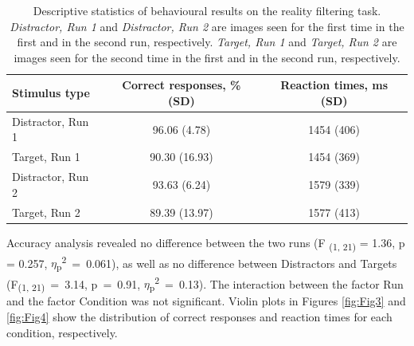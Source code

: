 \begin{table}
\begin{center}
\begin{tabular}{ ||l||c c|| } 

  \hline
\rowcolor{BabyBlue}
Stimulus type & Correct responses, \% (SD) & Reaction times, ms (SD) \\
  \hline
  \hline
Distractor, Run 1   & 96.06 (4.78) & 1454 (406) \\ 
  \hline
Target, Run 1      & 90.30 (16.93) & 1454 (369) \\ 
  \hline
Distractor, Run 2  & 93.63 (6.24) & 1579 (339) \\ 
  \hline
Target, Run 2      & 89.39 (13.97) & 1577 (413) \\ 

 \hline
\end{tabular}
\end{center}
\caption{Descriptive statistics of behavioural results on the reality filtering task. \textit{Distractor, Run 1} and \textit{Distractor, Run 2} are images seen for the first time in the first and in the second run, respectively. \textit{Target, Run 1} and \textit{Target, Run 2} are images seen for the second time in the first and in the second run, respectively.} \label{tbl:stimulus}
\end{table}




Accuracy analysis revealed no difference between the two runs (F \textsubscript{(1, 21)} = 1.36, p = 0.257, $\eta$\textsubscript{p}\textsuperscript{2}~=~0.061), as well as no difference between Distractors and Targets (F\textsubscript{(1, 21)}~=~3.14, p~=~0.91, $\eta$\textsubscript{p}\textsuperscript{2}~=~0.13). The interaction between the factor Run and the factor Condition was not significant. Violin plots in Figures \ref{fig:Fig3} and \ref{fig:Fig4} show the distribution of correct responses and reaction times for each condition, respectively. 





